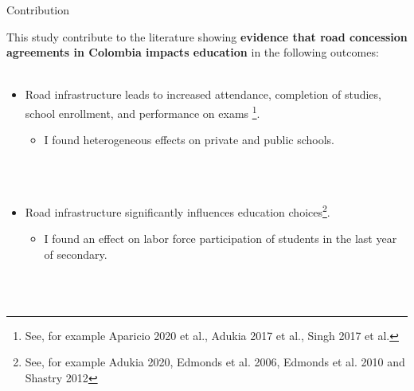 \documentclass[9pt]{beamer}
\begin{document}

 

 
\begin{frame}{Contribution \hyperlink{rev.literature}{} }
     \label{contribution}
     
This study contribute to the literature showing \textbf{evidence that road concession agreements in Colombia impacts education} in the following outcomes:\\~\\

\begin{itemize}
   \item Road infrastructure leads to increased attendance, completion of studies, school enrollment, and performance on exams \footnote{\footnotesize See, for example Aparicio 2020 et al., Adukia 2017 et al.,  Singh 2017 et al.}.  
   
        \begin{itemize}
              \item I found heterogeneous effects on private and public schools.
        \end{itemize}
\\~\\
 
   \item Road infrastructure significantly influences education choices\footnote{\footnotesize See, for example  Adukia 2020,   Edmonds et al. 2006, Edmonds et al. 2010 and Shastry 2012}.     %
        \begin{itemize}
              \item I found an effect on labor force participation of students in the last year of secondary.
        \end{itemize}
 
\\~\\
 

\end{itemize}
\end{frame}
\end{document}
